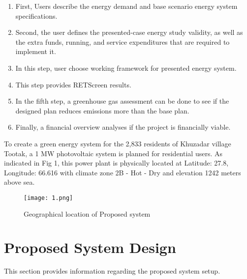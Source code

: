 \documentclass[conference]{IEEEtran}
\begin{document}
\begin{enumerate}
    \item First, Users describe the energy demand and base scenario energy system specifications.
    \item Second, the user defines the presented-case energy study validity, as well as the extra funds, running, and service expenditures that are required to implement it.
    \item In this step, user choose working framework for presented energy system.
    \item This step provides RETScreen results.
    \item In the fifth step, a greenhouse gas assessment can be done to see if the designed plan reduces emissions more than the base plan.
    \item Finally, a financial overview analyses if the project is financially viable.
\end{enumerate}
To create a green energy system for the 2,833 residents of Khuzadar village Tootak, a 1 MW photovoltaic system is planned for residential users. As indicated in Fig 1, this power plant is physically located at Latitude: 27.8, Longitude: 66.616 with climate zone 2B - Hot - Dry and elevation 1242 meters above sea.
\begin{figure}[htbp]
\centerline{\texttt{[image: 1.png]}}
\caption{ Geographical location of Proposed system}
\end{figure}
\section{Proposed System Design}
This section provides information regarding the proposed system setup.
\end{document}

